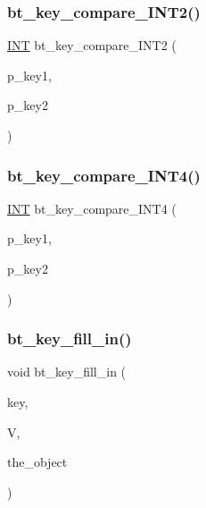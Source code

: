 \subsubsection{\texorpdfstring{bt\+\_\+key\+\_\+compare\+\_\+\+I\+N\+T2()}{bt\_key\_compare\_INT2()}}
{\footnotesize\ttfamily \mbox{\hyperlink{galois_8h_a09fddde158a3a20bd2dcadb609de11dc}{I\+NT}} bt\+\_\+key\+\_\+compare\+\_\+\+I\+N\+T2 (\begin{DoxyParamCaption}\item[{\mbox{\hyperlink{galois_8h_ab6cc7b4aeb6ea31aba2b3fbfc83ff5e6}{B\+Y\+TE}} $\ast$$\ast$}]{p\+\_\+key1,  }\item[{\mbox{\hyperlink{galois_8h_ab6cc7b4aeb6ea31aba2b3fbfc83ff5e6}{B\+Y\+TE}} $\ast$$\ast$}]{p\+\_\+key2 }\end{DoxyParamCaption})}

\mbox{\label{bt__key_8_c_afb03cce1de9c23799b1a852a8d66ae10}} 
\subsubsection{\texorpdfstring{bt\+\_\+key\+\_\+compare\+\_\+\+I\+N\+T4()}{bt\_key\_compare\_INT4()}}
{\footnotesize\ttfamily \mbox{\hyperlink{galois_8h_a09fddde158a3a20bd2dcadb609de11dc}{I\+NT}} bt\+\_\+key\+\_\+compare\+\_\+\+I\+N\+T4 (\begin{DoxyParamCaption}\item[{\mbox{\hyperlink{galois_8h_ab6cc7b4aeb6ea31aba2b3fbfc83ff5e6}{B\+Y\+TE}} $\ast$$\ast$}]{p\+\_\+key1,  }\item[{\mbox{\hyperlink{galois_8h_ab6cc7b4aeb6ea31aba2b3fbfc83ff5e6}{B\+Y\+TE}} $\ast$$\ast$}]{p\+\_\+key2 }\end{DoxyParamCaption})}

\mbox{\label{bt__key_8_c_a91e1d83fec4c2a6d4e45b96919377e91}} 
\subsubsection{\texorpdfstring{bt\+\_\+key\+\_\+fill\+\_\+in()}{bt\_key\_fill\_in()}}
{\footnotesize\ttfamily void bt\+\_\+key\+\_\+fill\+\_\+in (\begin{DoxyParamCaption}\item[{\mbox{\hyperlink{galois_8h_ab6cc7b4aeb6ea31aba2b3fbfc83ff5e6}{B\+Y\+TE}} $\ast$}]{key,  }\item[{\mbox{\hyperlink{class_vector}{Vector}} \&}]{V,  }\item[{\mbox{\hyperlink{class_vector}{Vector}} \&}]{the\+\_\+object }\end{DoxyParamCaption})}

